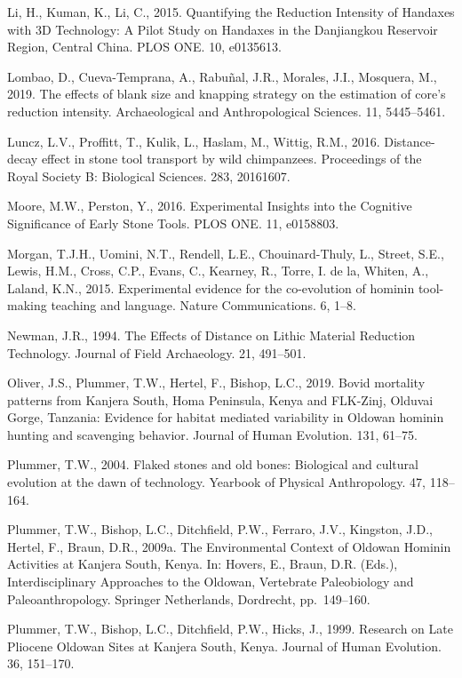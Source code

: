 \documentclass[]{elsarticle} %
\begin{document}
Li, H., Kuman, K., Li, C., 2015. Quantifying the Reduction Intensity of
Handaxes with 3D Technology: A Pilot Study on Handaxes in the
Danjiangkou Reservoir Region, Central China. PLOS ONE. 10, e0135613.

Lombao, D., Cueva-Temprana, A., Rabuñal, J.R., Morales, J.I., Mosquera,
M., 2019. The effects of blank size and knapping strategy on the
estimation of core's reduction intensity. Archaeological and
Anthropological Sciences. 11, 5445--5461.

Luncz, L.V., Proffitt, T., Kulik, L., Haslam, M., Wittig, R.M., 2016.
Distance-decay effect in stone tool transport by wild chimpanzees.
Proceedings of the Royal Society B: Biological Sciences. 283, 20161607.

Moore, M.W., Perston, Y., 2016. Experimental Insights into the Cognitive
Significance of Early Stone Tools. PLOS ONE. 11, e0158803.

Morgan, T.J.H., Uomini, N.T., Rendell, L.E., Chouinard-Thuly, L.,
Street, S.E., Lewis, H.M., Cross, C.P., Evans, C., Kearney, R., Torre,
I. de la, Whiten, A., Laland, K.N., 2015. Experimental evidence for the
co-evolution of hominin tool-making teaching and language. Nature
Communications. 6, 1--8.

Newman, J.R., 1994. The Effects of Distance on Lithic Material Reduction
Technology. Journal of Field Archaeology. 21, 491--501.

Oliver, J.S., Plummer, T.W., Hertel, F., Bishop, L.C., 2019. Bovid
mortality patterns from Kanjera South, Homa Peninsula, Kenya and
FLK-Zinj, Olduvai Gorge, Tanzania: Evidence for habitat mediated
variability in Oldowan hominin hunting and scavenging behavior. Journal
of Human Evolution. 131, 61--75.

Plummer, T.W., 2004. Flaked stones and old bones: Biological and
cultural evolution at the dawn of technology. Yearbook of Physical
Anthropology. 47, 118--164.

Plummer, T.W., Bishop, L.C., Ditchfield, P.W., Ferraro, J.V., Kingston,
J.D., Hertel, F., Braun, D.R., 2009a. The Environmental Context of
Oldowan Hominin Activities at Kanjera South, Kenya. In: Hovers, E.,
Braun, D.R. (Eds.), Interdisciplinary Approaches to the Oldowan,
Vertebrate Paleobiology and Paleoanthropology. Springer Netherlands,
Dordrecht, pp.~149--160.

Plummer, T.W., Bishop, L.C., Ditchfield, P.W., Hicks, J., 1999. Research
on Late Pliocene Oldowan Sites at Kanjera South, Kenya. Journal of Human
Evolution. 36, 151--170.
\end{document}
